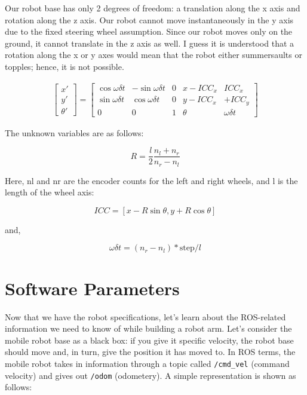 \documentclass[letterpaper,pdftex]{article}
\begin{document}
Our robot base has only 2 degrees of freedom: a translation along the x axis and rotation along the z axis. Our robot cannot move instantaneously in the y axis due to the fixed steering wheel assumption. Since our robot moves only on the ground, it cannot translate in the z axis as well. I guess it is understood that a rotation along the x or y axes would mean that the robot either summersaults or topples; hence, it is not possible.

\begin{gather}
 \begin{bmatrix} x' \\ y' \\ \theta' \end{bmatrix}
 =
\begin{bmatrix}
\cos{\omega \delta t} & -\sin{\omega \delta t} & 0 & x - ICC_x & ICC_x \\
 \sin{\omega\delta t} & \cos{\omega\delta t} & 0 & y- ICC_x & + ICC_y \\
 0 & 0 & 1 & \theta & \omega \delta t
\end{bmatrix}
\end{gather}

The unknown variables are as follows:

\begin{equation}
R = \frac{l}{2}\frac{n_l+n_r}{n_r - n_l}
\end{equation}

Here, nl and nr are the encoder counts for the left and right wheels, and l is the length of the wheel axis:

\begin{equation}
ICC = [x - R\sin{\theta}, y+ R\cos{\theta}]
\end{equation}

and, 

\begin{equation}
\omega\delta t = (n_r - n_l)* \text{step}/l
\end{equation}

\section{Software Parameters}

Now that we have the robot specifications, let's learn about the ROS-related information we need to know of while building a robot arm. Let's consider the mobile robot base as a black box: if you give it specific velocity, the robot base should move and, in turn, give the position it has moved to. In ROS terms, the mobile robot takes in information through a topic called \verb|/cmd_vel| (command velocity) and gives out \verb|/odom| (odometery). A simple representation is shown as follows:
\end{document}
